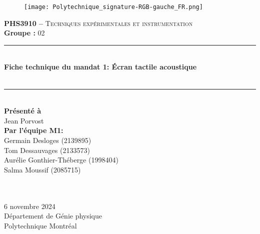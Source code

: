 \begin{titlepage}\center

\begin{figure}
    \texttt{[image: Polytechnique\_signature-RGB-gauche\_FR.png]}
\end{figure}
\vspace*{0.5cm}

\textsc{\Large \textbf{PHS3910 --} Techniques expérimentales et instrumentation}\\[0.5cm] 
\large{\textbf{Groupe : }02}
\\[1.5cm] 

\rule{\linewidth}{0.5mm} \\[0.5cm]
\Large{\textbf{Fiche technique du mandat 1: Écran tactile acoustique}} \\[0.5cm] \\[0.2cm]
\rule{\linewidth}{0.5mm} \\[2cm]

\large{
 \textbf{Présenté à}\\
 Jean Porvost\\
 [2cm]

  \textbf{Par l'équipe M1:}\\
Germain Desloges (2139895)\\
Tom Dessauvages (2133573) \\
Aurélie Gonthier-Théberge (1998404)\\
Salma Moussif (2085715) \\

 \textbf{} \\
 \textbf{} \\[1cm]}

\large{
6 novembre 2024\\
Département de Génie physique\\
Polytechnique Montréal\\}


\end{titlepage}
